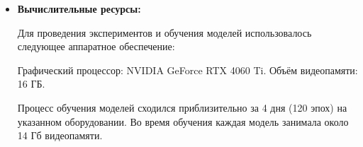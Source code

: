\begin{itemize}
    \item \textbf{Вычислительные ресурсы:}

    Для проведения экспериментов и обучения моделей использовалось следующее аппаратное обеспечение:

    Графический процессор: NVIDIA GeForce RTX 4060 Ti. Объём видеопамяти: 16 ГБ.

    Процесс обучения моделей сходился  приблизительно за 4 дня (120 эпох) на указанном оборудовании. Во время обучения каждая модель занимала около 14 Гб видеопамяти. 

\end{itemize}



\newpage
